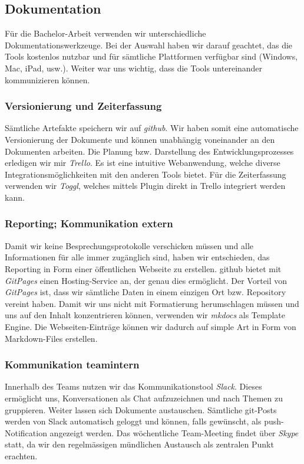 \subsection{Dokumentation}

Für die Bachelor-Arbeit verwenden wir unterschiedliche Dokumentationswerkzeuge. Bei der Auswahl haben wir darauf geachtet, das die Tools kostenlos nutzbar und für sämtliche Plattformen verfügbar sind (Windows, Mac, iPad, usw.). Weiter war uns wichtig, dass die Tools untereinander kommunizieren können. 

\subsubsection*{Versionierung und Zeiterfassung}
Sämtliche Artefakte speichern wir auf \textit{github}. Wir haben somit eine automatische Versionierung der Dokumente und können unabhängig voneinander an den Dokumenten arbeiten. Die Planung bzw. Darstellung des Entwicklungsprozesses erledigen wir mir \textit{Trello}. Es ist eine intuitive Webanwendung, welche diverse Integrationsmöglichkeiten mit den anderen Tools bietet. Für die Zeiterfassung verwenden wir \textit{Toggl}, welches mittels Plugin direkt in Trello integriert werden kann.

\subsubsection*{Reporting; Kommunikation extern}
Damit wir keine Besprechungsprotokolle verschicken müssen und alle Informationen für alle immer zugänglich sind, haben wir entschieden, das Reporting in Form einer öffentlichen Webseite zu erstellen. github bietet mit \textit{GitPages} einen Hosting-Service an, der genau dies ermöglicht. Der Vorteil von \textit{GitPages} ist, dass wir sämtliche Daten in einem einzigen Ort bzw. Repository vereint haben. Damit wir uns nicht mit Formatierung herumschlagen müssen und uns auf den Inhalt konzentrieren können, verwenden wir \textit{mkdocs} als Template Engine. Die Webseiten-Einträge können wir dadurch auf simple Art in Form von Markdown-Files erstellen.

\subsubsection*{Kommunikation teamintern}
Innerhalb des Teams nutzen wir das Kommunikationstool \textit{Slack}. Dieses ermöglicht uns, Konversationen als Chat aufzuzeichnen und nach Themen zu gruppieren. Weiter lassen sich Dokumente austauschen. Sämtliche git-Posts werden von Slack automatisch geloggt und können, falls gewünscht, als push-Notification angezeigt werden.
Das wöchentliche Team-Meeting findet über \textit{Skype} statt, da wir den regelmässigen mündlichen Austausch als zentralen Punkt erachten.

